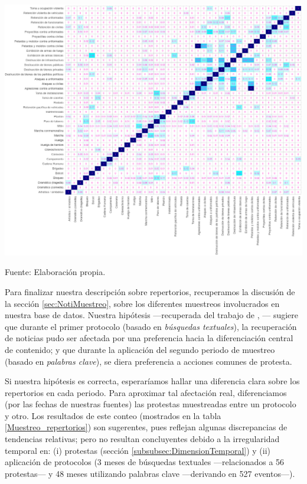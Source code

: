\documentclass[letterpaper, 11pt]{book}
\theoremstyle{definition}
\theoremstyle{remark}
\begin{document}
\begin{minipage}{\linewidth}
\centering
{} \label{3.22_simRepertorios}
\hspace{-4em}\includegraphics[scale=0.44]{img/3.22_simRepertorios.png}
\par
\small Fuente: Elaboración propia.
\end{minipage}\bigskip


Para finalizar nuestra descripción sobre repertorios, recuperamos la discusión de la sección \ref{sec:NotiMuestreo}, sobre los diferentes muestreos involucrados en nuestra base de datos. 
Nuestra hipótesis ---recuperada del trabajo de \citet{2010_Strawn_keywordSearch}, \citet{2001_Maney_Oliver__FindingEvents}--- sugiere que durante el primer protocolo (basado en \emph{búsquedas textuales}), la recuperación de noticias pudo ser afectada por una preferencia hacia la diferenciación central de contenido; y que durante la aplicación del segundo periodo de muestreo (basado en \emph{palabras clave}), se diera preferencia a acciones comunes de protesta. 

Si nuestra hipótesis es correcta, esperaríamos hallar una diferencia clara sobre los repertorios en cada periodo. 
Para aproximar tal afectación real, diferenciamos (por las fechas de nuestras fuentes) las protestas muestreadas entre un protocolo y otro. 
Los resultados de este conteo (mostrados en la tabla \ref{Muestreo_repertorios}) son sugerentes, pues reflejan algunas discrepancias de tendencias relativas; pero no resultan concluyentes debido a la irregularidad temporal en: (i) protestas (sección \ref{subsubsec:DimensionTemporal}) y (ii) aplicación de protocolos (3 meses de búsquedas textuales ---relacionados a 56 protestas--- y 48 meses utilizando palabras clave ---derivando en 527 eventos---). 
\end{document}
